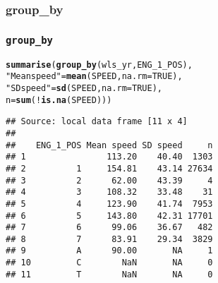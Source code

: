 \documentclass{beamer}\usepackage[]{graphicx}\usepackage[]{color}
\makeatletter
\newcommand{\hlnum}[1]{\textcolor[rgb]{0.686,0.059,0.569}{#1}}%
\newcommand{\hlstr}[1]{\textcolor[rgb]{0.192,0.494,0.8}{#1}}%
\newcommand{\hlopt}[1]{\textcolor[rgb]{0,0,0}{#1}}%
\newcommand{\hlstd}[1]{\textcolor[rgb]{0.345,0.345,0.345}{#1}}%
\newcommand{\hlkwc}[1]{\textcolor[rgb]{0.333,0.667,0.333}{#1}}%
\newcommand{\hlkwd}[1]{\textcolor[rgb]{0.737,0.353,0.396}{\textbf{#1}}}%
\newenvironment{kframe}{%
 \def\at@end@of@kframe{}%
 \ifinner\ifhmode%
  \def\at@end@of@kframe{\end{minipage}}%
  \begin{minipage}{\columnwidth}%
 \fi\fi%
 \def\FrameCommand##1{\hskip\@totalleftmargin \hskip-\fboxsep
 \colorbox{shadecolor}{##1}\hskip-\fboxsep
     \hskip-\linewidth \hskip-\@totalleftmargin \hskip\columnwidth}%
 \MakeFramed {\advance\hsize-\width
   \@totalleftmargin\z@ \linewidth\hsize
   \@setminipage}}%
 {\par\unskip\endMakeFramed%
 \at@end@of@kframe}
\newenvironment{knitrout}{}{} %
\makeatother
\begin{document}
\subsubsection{group\_by}%
\begin{frame}[fragile]
  \frametitle{{\tt group\_by}}
\begin{knitrout}\footnotesize
{}\color{fgcolor}\begin{kframe}
\begin{alltt}
\hlkwd{summarise}\hlstd{(}\hlkwd{group_by}\hlstd{(wls_yr, ENG_1_POS),}
          \hlstr{"Mean speed"} \hlstd{=} \hlkwd{mean}\hlstd{(SPEED,} \hlkwc{na.rm} \hlstd{=} \hlnum{TRUE}\hlstd{),}
          \hlstr{"SD speed"}   \hlstd{=} \hlkwd{sd}\hlstd{(SPEED,} \hlkwc{na.rm} \hlstd{=} \hlnum{TRUE}\hlstd{),}
          \hlkwc{n}            \hlstd{=} \hlkwd{sum}\hlstd{(}\hlopt{!}\hlkwd{is.na}\hlstd{(SPEED)))}
\end{alltt}
\begin{verbatim}
## Source: local data frame [11 x 4]
## 
##    ENG_1_POS Mean speed SD speed     n
## 1                113.20    40.40  1303
## 2          1     154.81    43.14 27634
## 3          2      62.00    43.39     4
## 4          3     108.32    33.48    31
## 5          4     123.90    41.74  7953
## 6          5     143.80    42.31 17701
## 7          6      99.06    36.67   482
## 8          7      83.91    29.34  3829
## 9          A      90.00       NA     1
## 10         C        NaN       NA     0
## 11         T        NaN       NA     0
\end{verbatim}
\end{kframe}
\end{knitrout}
\end{frame} 
\end{document}
